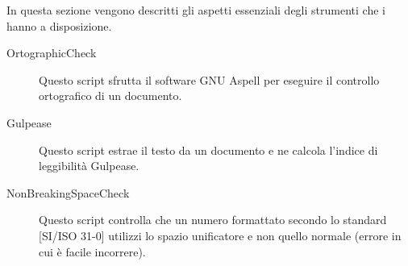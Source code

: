 			In questa sezione vengono descritti gli aspetti essenziali degli strumenti che i  hanno a disposizione.
			\begin{description}
				\item[OrtographicCheck] Questo script sfrutta il software GNU Aspell per eseguire il controllo ortografico di un documento.
				\item[Gulpease] Questo script estrae il testo da un documento e ne calcola l'indice di leggibilità Gulpease.
				\item[NonBreakingSpaceCheck] Questo script controlla che un numero formattato secondo lo standard [SI/ISO 31-0] utilizzi lo spazio unificatore e non quello normale (errore in cui è facile incorrere).
			\end{description}